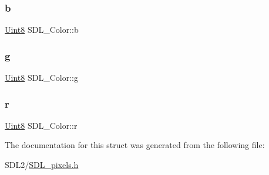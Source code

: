 \subsubsection{\texorpdfstring{b}{b}}
{\footnotesize\ttfamily \hyperlink{_s_d_l__stdinc_8h_a2944638813a090aa23e62f4da842c3e2}{Uint8} S\+D\+L\+\_\+\+Color\+::b}

\mbox{\label{struct_s_d_l___color_ae29d881bf740cfa7078b36e07f85d298}} 
\subsubsection{\texorpdfstring{g}{g}}
{\footnotesize\ttfamily \hyperlink{_s_d_l__stdinc_8h_a2944638813a090aa23e62f4da842c3e2}{Uint8} S\+D\+L\+\_\+\+Color\+::g}

\mbox{\label{struct_s_d_l___color_a0bb975b6829524133fdd3c6060cfa63d}} 
\subsubsection{\texorpdfstring{r}{r}}
{\footnotesize\ttfamily \hyperlink{_s_d_l__stdinc_8h_a2944638813a090aa23e62f4da842c3e2}{Uint8} S\+D\+L\+\_\+\+Color\+::r}



The documentation for this struct was generated from the following file\+:\begin{DoxyCompactItemize}
\item 
S\+D\+L2/\hyperlink{_s_d_l__pixels_8h}{S\+D\+L\+\_\+pixels.\+h}\end{DoxyCompactItemize}
